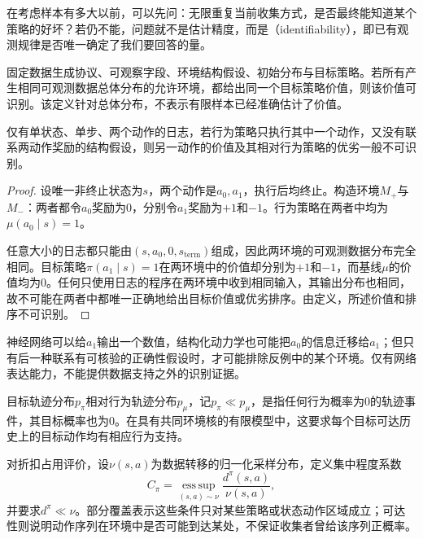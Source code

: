 在考虑样本有多大以前，可以先问：无限重复当前收集方式，是否最终能知道某个策略的好坏？若仍不能，问题就不是估计精度，而是（identifiability），即已有观测规律是否唯一确定了我们要回答的量。

\begin{definition}[策略价值可识别]
  \label{def:rl-information-identifiability}
  固定数据生成协议、可观察字段、环境结构假设、初始分布与目标策略。若所有产生相同可观测数据总体分布的允许环境，都给出同一个目标策略价值，则该价值可识别。该定义针对总体分布，不表示有限样本已经准确估计了价值。
\end{definition}

\begin{theorem}[固定经验不能识别未覆盖动作的价值]
  \label{thm:rl-information-unseen-action}
  仅有单状态、单步、两个动作的日志，若行为策略只执行其中一个动作，又没有联系两动作奖励的结构假设，则另一动作的价值及其相对行为策略的优劣一般不可识别。
\end{theorem}

\begin{proof}
  设唯一非终止状态为$s$，两个动作是$a_0,a_1$，执行后均终止。构造环境$M_+$与$M_-$：两者都令$a_0$奖励为0，分别令$a_1$奖励为$+1$和$-1$。行为策略在两者中均为$\mu(a_0\mid s)=1$。

  任意大小的日志都只能由$(s,a_0,0,s_{\mathrm{term}})$组成，因此两环境的可观测数据分布完全相同。目标策略$\pi(a_1\mid s)=1$在两环境中的价值却分别为$+1$和$-1$，而基线$\mu$的价值均为0。任何只使用日志的程序在两环境中收到相同输入，其输出分布也相同，故不可能在两者中都唯一正确地给出目标价值或优劣排序。由定义，所述价值和排序不可识别。
\end{proof}

神经网络可以给$a_1$输出一个数值，结构化动力学也可能把$a_0$的信息迁移给$a_1$；但只有后一种联系有可核验的正确性假设时，才可能排除反例中的某个环境。仅有网络表达能力，不能提供数据支持之外的识别证据。

\begin{definition}[支持、集中程度与部分覆盖]
  \label{def:rl-information-support}
  目标轨迹分布$p_\pi$相对行为轨迹分布$p_\mu$，记$p_\pi\ll p_\mu$，是指任何行为概率为0的轨迹事件，其目标概率也为0。在具有共同环境核的有限模型中，这要求每个目标可达历史上的目标动作均有相应行为支持。

  对折扣占用评价，设$\nu(s,a)$为数据转移的归一化采样分布，定义集中程度系数
  \[
    C_\pi=\operatorname*{ess\,sup}_{(s,a)\sim\nu}
               \frac{d^\pi(s,a)}{\nu(s,a)},
  \]
  并要求$d^\pi\ll\nu$。部分覆盖表示这些条件只对某些策略或状态动作区域成立；可达性则说明动作序列在环境中是否可能到达某处，不保证收集者曾给该序列正概率。
\end{definition}

